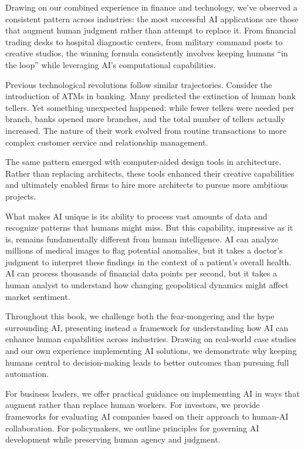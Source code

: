 \documentclass[
  Letterpaper,
]{scrbook}
\begin{document}
Drawing on our combined experience in finance and technology, we've
observed a consistent pattern across industries: the most successful AI
applications are those that augment human judgment rather than attempt
to replace it. From financial trading desks to hospital diagnostic
centers, from military command posts to creative studios, the winning
formula consistently involves keeping humans ``in the loop'' while
leveraging AI's computational capabilities.

Previous technological revolutions follow similar trajectories. Consider
the introduction of ATMs in banking. Many predicted the extinction of
human bank tellers. Yet something unexpected happened: while fewer
tellers were needed per branch, banks opened more branches, and the
total number of tellers actually increased. The nature of their work
evolved from routine transactions to more complex customer service and
relationship management.

The same pattern emerged with computer-aided design tools in
architecture. Rather than replacing architects, these tools enhanced
their creative capabilities and ultimately enabled firms to hire more
architects to pursue more ambitious projects.

What makes AI unique is its ability to process vast amounts of data and
recognize patterns that humans might miss. But this capability,
impressive as it is, remains fundamentally different from human
intelligence. AI can analyze millions of medical images to flag
potential anomalies, but it takes a doctor's judgment to interpret these
findings in the context of a patient's overall health. AI can process
thousands of financial data points per second, but it takes a human
analyst to understand how changing geopolitical dynamics might affect
market sentiment.

Throughout this book, we challenge both the fear-mongering and the hype
surrounding AI, presenting instead a framework for understanding how AI
can enhance human capabilities across industries. Drawing on real-world
case studies and our own experience implementing AI solutions, we
demonstrate why keeping humans central to decision-making leads to
better outcomes than pursuing full automation.

For business leaders, we offer practical guidance on implementing AI in
ways that augment rather than replace human workers. For investors, we
provide frameworks for evaluating AI companies based on their approach
to human-AI collaboration. For policymakers, we outline principles for
governing AI development while preserving human agency and judgment.
\end{document}

